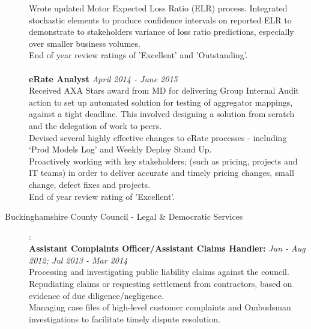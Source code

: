 \documentclass[11pt]{article}
\begin{document}
\begin{description}
\textbullet \quad Wrote updated Motor Expected Loss Ratio (ELR) process. Integrated stochastic elements to produce confidence intervals on reported ELR to demonstrate to stakeholders variance of loss ratio predictions, especially over smaller business volumes. \\
\textbullet \quad End of year review ratings of 'Excellent' and 'Outstanding'.
\\\\
\textbf{eRate Analyst} \emph{April 2014 - June 2015}\\
\textbullet \quad Received AXA Stars award from MD for delivering Group Internal Audit action to set up automated solution for testing of aggregator mappings, against a tight deadline. This involved designing a solution from scratch and the delegation of work to peers.\\
\textbullet \quad Devised several highly effective changes to eRate processes - including `Prod Models Log' and Weekly Deploy Stand Up.\\
\textbullet \quad Proactively working with key stakeholders; (such as pricing, projects and IT teams) in order to deliver accurate and timely pricing changes, small change, defect fixes and projects.\\
\textbullet \quad End of year review rating of 'Excellent'.


\item[Buckinghamshire County Council - Legal \& Democratic Services]:\\
\textbf{Assistant Complaints Officer/Assistant Claims Handler:} \emph{Jun - Aug 2012; Jul 2013 - Mar 2014}\\
\textbullet \quad Processing and investigating public liability claims against the council. Repudiating claims or requesting settlement from contractors, based on evidence of due diligence/negligence. \\
\textbullet \quad Managing case files of high-level customer complaints and Ombudsman investigations to facilitate timely dispute resolution.


\end{description}
\end{document}
